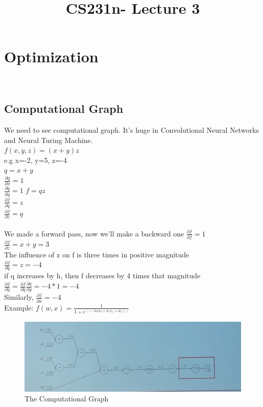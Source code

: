 \documentclass{article}
\begin{document}
\title{CS231n- Lecture 3}
\maketitle
\section{Optimization}
\ \subsection{Computational Graph}
We need to see computational graph. It's huge in Convolutional Neural Networks and Neural Turing Machine.\\
$f(x,y,z)=(x+y)z$ \\
e.g x=-2, y=5, z=-4\\
$q=x+y$ \\ $\frac{\partial q}{\partial x}=1$ \\ $\frac{\partial q}{\partial y}=1$
$f=qz$ \\ $\frac{\partial f}{\partial q}=z$ \\ $\frac{\partial f}{\partial z} = q$ \\
\\ We made a forward pass, now we'll make a backward one
$\frac{\partial f}{\partial f}=1$ \\
$\frac{\partial f}{\partial z}=x+y=3$ \\ The influence of z on f is three times in positive magnitude \\
$\frac{\partial f}{\partial q}=z=-4$ \\  if q increases by h, then f decreases by 4 times that magnitude
$\frac{\partial f}{\partial y} = \frac{\partial f}{\partial q} \frac{\partial q}{\partial y}=-4 * 1 = -4$ \\
Similarly, $\frac{\partial f}{\partial x} = -4$  \\
Example: $f(w,x)= \frac{1}{1+e^(-(w_0 x_0 + w_1 x_1 + w_2))}$
\begin{figure}
  \includegraphics[width=\linewidth]{SS1.png}
  \caption{The Computational Graph}
  \label{fig:cGraph1}
\end{figure}
\end{document}
